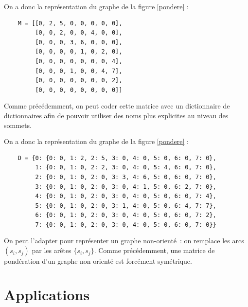 On a donc la représentation du graphe de la figure \ref{pondere} :

\begin{Verbatim}
    M = [[0, 2, 5, 0, 0, 0, 0, 0],
         [0, 0, 2, 0, 0, 4, 0, 0],
         [0, 0, 0, 3, 6, 0, 0, 0],
         [0, 0, 0, 0, 1, 0, 2, 0],
         [0, 0, 0, 0, 0, 0, 0, 4],
         [0, 0, 0, 1, 0, 0, 4, 7],
         [0, 0, 0, 0, 0, 0, 0, 2],
         [0, 0, 0, 0, 0, 0, 0, 0]]
\end{Verbatim}

Comme précédemment, on peut coder cette matrice avec un dictionnaire de dictionnaires afin de pouvoir utiliser des noms plus explicites au niveau des sommets.

On a donc la représentation du graphe de la figure \ref{pondere} :

\begin{Verbatim}
    D = {0: {0: 0, 1: 2, 2: 5, 3: 0, 4: 0, 5: 0, 6: 0, 7: 0}, 
         1: {0: 0, 1: 0, 2: 2, 3: 0, 4: 0, 5: 4, 6: 0, 7: 0}, 
         2: {0: 0, 1: 0, 2: 0, 3: 3, 4: 6, 5: 0, 6: 0, 7: 0}, 
         3: {0: 0, 1: 0, 2: 0, 3: 0, 4: 1, 5: 0, 6: 2, 7: 0}, 
         4: {0: 0, 1: 0, 2: 0, 3: 0, 4: 0, 5: 0, 6: 0, 7: 4}, 
         5: {0: 0, 1: 0, 2: 0, 3: 1, 4: 0, 5: 0, 6: 4, 7: 7}, 
         6: {0: 0, 1: 0, 2: 0, 3: 0, 4: 0, 5: 0, 6: 0, 7: 2}, 
         7: {0: 0, 1: 0, 2: 0, 3: 0, 4: 0, 5: 0, 6: 0, 7: 0}}
\end{Verbatim}

On peut l'adapter pour représenter un graphe non-orienté~: on remplace les arcs $(s_i, s_j)$ par les arêtes $\{s_i, s_j\}$. Comme précédemment, une matrice de pondération d'un graphe non-orienté est forcément symétrique.




%
%
%
%
%
%

\section{Applications}

